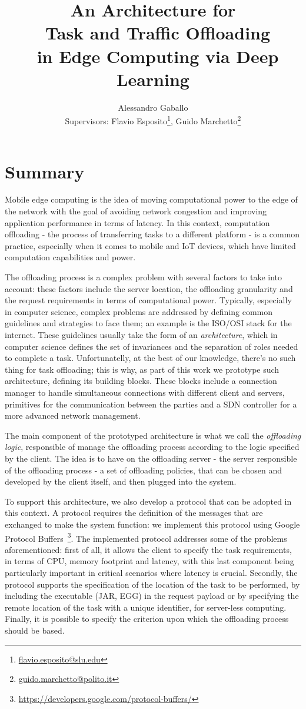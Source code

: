 \documentclass[12pt, a4paper]{article}
\title{An Architecture for\\~Task and Traffic Offloading\\~in Edge Computing via Deep Learning}
\author{Alessandro Gaballo\\Supervisors: Flavio Esposito\thanks{\href{mailto:flavio.esposito@slu.edu}{flavio.esposito@slu.edu}}, Guido Marchetto\thanks{\href{mailto:guido.marchetto@polito.it}{guido.marchetto@polito.it}}}
\date{}
\begin{document}
\maketitle
\section{Summary}
Mobile edge computing is the idea of moving computational power to the edge of the network with the goal of avoiding network congestion and improving application performance in terms of latency. In this context, computation offloading - the process of transferring tasks to a different platform - is a common practice, especially when it comes to mobile and IoT devices, which have limited computation capabilities and power. 

The offloading process is a complex problem with several factors to take into account: these factors include the server location, the offloading granularity and the request requirements in terms of computational power. Typically, especially in computer science, complex problems are addressed by defining common guidelines and strategies to face them; an example is the ISO/OSI stack for the internet. These guidelines usually take the form of an \textit{architecture}, which in computer science defines the set of invariances and the separation of roles needed to complete a task. Unfortunatelly, at the best of our knowledge, there's no such thing for task offloading; this is why, as part of this work we prototype such architecture, defining its building blocks. These blocks include a connection manager to handle simultaneous connections with different client and servers, primitives for the communication between the parties and a SDN controller for a more advanced network management. 

The main component of the prototyped architecture is what we call the \textit{offloading logic}, responsible of manage the offloading process according to the logic specified by the client. The idea is to have on the offloading server - the server responsible of the offloading process - a set of offloading policies, that can be chosen and developed by the client itself, and then plugged into the system.

To support this architecture, we also develop a protocol that can be adopted in this context. A protocol requires the definition of the messages that are exchanged to make the system function: we implement this protocol using Google Protocol Buffers~\footnote{\url{https://developers.google.com/protocol-buffers/}}. The implemented protocol addresses some of the problems aforementioned: first of all, it allows the client to specify the task requirements, in terms of CPU, memory footprint and latency, with this last component being particularly important in critical scenarios where latency is crucial. Secondly, the protocol supports the specification of the location of the task to be performed, by including the executable (JAR, EGG) in the request payload or by specifying the remote location of the task with a unique identifier, for server-less computing. Finally, it is possible to specify the criterion upon which the offloading process should be based.
\end{document}
